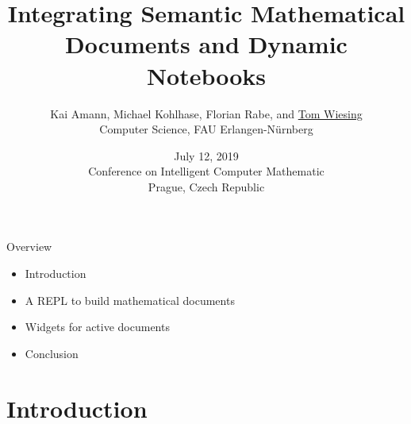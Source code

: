 \documentclass{beamer}
\title[Semantic Documents and Dynamic Notebooks]{Integrating Semantic Mathematical Documents and Dynamic Notebooks}
\author[Tom Wiesing et al.]{Kai Amann, Michael Kohlhase, Florian Rabe, and \underline{Tom Wiesing}\\Computer Science, FAU Erlangen-N{\"u}rnberg}
\date[July 12 2019, CICM Prague]{July 12, 2019\\Conference on Intelligent Computer Mathematic\\Prague, Czech Republic}
\begin{document}
    \frame{\titlepage}

    \begin{frame}{Overview}
        \begin{itemize}
            \item Introduction
            \item A REPL to build mathematical documents
            \item Widgets for active documents
            \item Conclusion
        \end{itemize}
    \end{frame}

    \section{Introduction}
\end{document}
